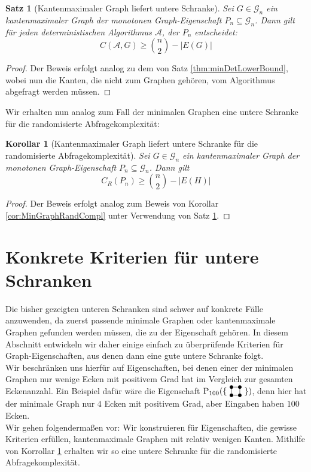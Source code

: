 \documentclass[a4paper]{scrreprt}
\newtheorem{Satz}[definition]{Satz}
\newtheorem{corollary}[definition]{Korollar}
\theoremstyle{definition}
\newcommand{\Square}{
\begin{tikzpicture}[main_node/.style={circle,fill=black},
inner sep=1.5pt, baseline=2pt]

    \node[main_node] (1) at (0,0) {};
    \node[main_node] (2) at (0.35, 0)  {};
    \node[main_node] (3) at (0.35, 0.35) {};
    \node[main_node] (4) at (0, 0.35) {};

    \draw (1) -- (2) -- (3) -- (4) -- (1);
\end{tikzpicture}
}
\begin{document}
\begin{Satz}[Kantenmaximaler Graph liefert untere Schranke]
\label{thm:EdgeMaxGraphLowerBound}
Sei $G\in \mathcal{G}_n$ ein kantenmaximaler Graph der monotonen
Graph-Eigenschaft $P_n \subseteq \mathcal{G}_n$.
Dann gilt für jeden deterministischen Algorithmus $\mathcal{A}$,
der $P_n$ entscheidet: 
$$ C(\mathcal{A}, G) \geq \binom{n}{2} - |E(G)| $$
\end{Satz}
\begin{proof}
Der Beweis erfolgt analog zu dem von Satz \ref{thm:minDetLowerBound},
wobei nun die Kanten, die nicht zum Graphen gehören, vom Algorithmus
abgefragt werden müssen.
\end{proof}
Wir erhalten nun analog zum Fall der minimalen Graphen eine untere
Schranke für die randomisierte Abfragekomplexität:
\begin{corollary} [Kantenmaximaler Graph liefert untere Schranke
für die randomisierte Abfragekomplexität]
\label{thm:EdgeMaximalRandCompl}
Sei $G\in\mathcal{G}_n$ ein kantenmaximaler Graph der monotonen
Graph-Eigenschaft $P_n \subseteq \mathcal{G}_n$.
Dann gilt
$$ C_R(P_n) \geq \binom{n}{2} - |E(H)| $$
\end{corollary}
\begin{proof}
Der Beweis erfolgt analog zum Beweis von Korollar \ref{cor:MinGraphRandCompl}
unter Verwendung von Satz \ref{thm:EdgeMaxGraphLowerBound}.
\end{proof}

\section{Konkrete Kriterien für untere Schranken}
Die bisher gezeigten unteren Schranken sind schwer auf konkrete
Fälle anzuwenden, da zuerst passende minimale Graphen oder kantenmaximale
Graphen gefunden werden müssen, die zu der Eigenschaft gehören.
In diesem Abschnitt entwickeln wir daher einige einfach zu überprüfende
Kriterien für Graph-Eigenschaften, aus denen dann eine gute
untere Schranke folgt. \\
Wir beschränken uns hierfür auf Eigenschaften, bei denen einer
der minimalen Graphen nur wenige Ecken mit positivem Grad hat
im Vergleich zur gesamten Eckenanzahl. Ein Beispiel dafür wäre
die Eigenschaft $\operatorname{P}_{100}(\{ \ \Square \ \})$,
denn hier hat der minimale Graph nur $4$ Ecken mit positivem
Grad, aber Eingaben haben $100$ Ecken. \\
Wir gehen folgendermaßen vor: Wir konstruieren für Eigenschaften,
die gewisse Kriterien erfüllen, kantenmaximale Graphen mit 
relativ wenigen Kanten. Mithilfe von Korrollar 
\ref{thm:EdgeMaximalRandCompl} erhalten wir so eine untere Schranke
für die randomisierte Abfragekomplexität.
\end{document}
